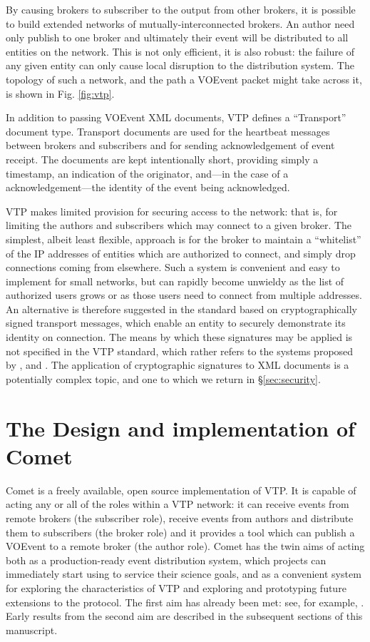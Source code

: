 \documentclass[5p,authoryear]{elsarticle}
\begin{document}
By causing brokers to subscriber to the output from other brokers, it is
possible to build extended networks of mutually-interconnected brokers. An
author need only publish to one broker and ultimately their event will be
distributed to all entities on the network. This is not only efficient, it is
also robust: the failure of any given entity can only cause local disruption
to the distribution system. The topology of such a network, and the path a
VOEvent packet might take across it, is shown in Fig. \ref{fig:vtp}.

In addition to passing VOEvent XML documents, VTP defines a ``Transport''
document type. Transport documents are used for the heartbeat messages between
brokers and subscribers and for sending acknowledgement of event receipt. The
documents are kept intentionally short, providing simply a timestamp, an
indication of the originator, and---in the case of a acknowledgement---the
identity of the event being acknowledged.

VTP makes limited provision for securing access to the network: that is, for
limiting the authors and subscribers which may connect to a given broker. The
simplest, albeit least flexible, approach is for the broker to maintain a
``whitelist'' of the IP addresses of entities which are authorized to connect,
and simply drop connections coming from elsewhere. Such a system is convenient
and easy to implement for small networks, but can rapidly become unwieldy as
the list of authorized users grows or as those users need to connect from
multiple addresses. An alternative is therefore suggested in the standard
based on cryptographically signed transport messages, which enable an entity
to securely demonstrate its identity on connection. The means by which these
signatures may be applied is not specified in the VTP standard, which rather
refers to the systems proposed by \citet{Rixon:2005}, \citet{Denny:2008} and
\citet{Allen:2008}.  The application of cryptographic signatures to XML
documents is a potentially complex topic, and one to which we return in
\S\ref{sec:security}.

\section{The Design and implementation of Comet}
\label{sec:design}

Comet is a freely available, open source implementation of VTP. It is capable
of acting any or all of the roles within a VTP network: it can receive events
from remote brokers (the subscriber role), receive events from authors and
distribute them to subscribers (the broker role) and it provides a tool which
can publish a VOEvent to a remote broker (the author role). Comet has the twin
aims of acting both as a production-ready event distribution system, which
projects can immediately start using to service their science goals, and as a
convenient system for exploring the characteristics of VTP and exploring and
prototyping future extensions to the protocol. The first aim has already been
met: see, for example, \citet{Staley:2013}. Early results from the second aim
are described in the subsequent sections of this manuscript.
\end{document}
